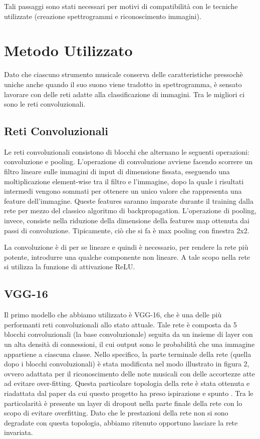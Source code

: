 \documentclass{article}
\begin{document}
Tali passaggi sono stati necessari per motivi di compatibilità con le tecniche utilizzate (creazione spettrogrammi e riconoscimento immagini).

\section{Metodo Utilizzato}
Dato che ciascuno strumento musicale conserva delle caratteristiche pressochè uniche anche quando il suo suono viene tradotto in spettrogramma,
è sensato lavorare con delle reti adatte alla classificazione di immagini. Tra le migliori ci sono le reti convoluzionali.

\subsection{Reti Convoluzionali}
Le reti convoluzionali consistono di blocchi che alternano le seguenti operazioni:
convoluzione e pooling. L'operazione di convoluzione avviene facendo scorrere un filtro lineare sulle immagini di input di dimensione fissata,
eseguendo una moltiplicazione element-wise tra il filtro e l'immagine, dopo la quale i risultati intermedi vengono sommati per ottenere un unico valore
che rappresenta una feature dell'immagine. Queste features saranno imparate durante il training dalla rete per mezzo del classico algoritmo di backpropagation.
L'operazione di pooling, invece, consiste nella riduzione della dimensione della features map ottenuta dai passi di convoluzione. 
Tipicamente, ciò che si fa è max pooling con finestra 2x2.  

La convoluzione è di per se lineare e quindi è necessario, per rendere la rete più potente, introdurre una qualche componente non lineare.
A tale scopo nella rete si utilizza la funzione di attivazione ReLU. 

\subsection{VGG-16}
Il primo modello che abbiamo utilizzato è VGG-16, che è una delle più performanti reti convoluzionali allo stato attuale.
Tale rete è composta da 5 blocchi convoluzionali (la base convoluzionale) seguita da un insieme di layer con un alta densità di connessioni,
il cui output sono le probabilità che una immagine appartiene a ciascuna classe.
Nello specifico, la parte terminale della rete (quella dopo i blocchi convoluzionali) è stata modificata nel modo illustrato in figura 2, 
ovvero adattata per il riconoscimento delle note musicali con delle accortezze atte ad evitare over-fitting. Questa particolare topologia della rete
è stata ottenuta e riadattata dal paper da cui questo progetto ha preso ispirazione e spunto \cite{paper}. Tra le particolarità
è presente un layer di dropout nella parte finale della rete con lo scopo di evitare overfitting. Dato che le prestazioni della rete non si sono degradate
con questa topologia, abbiamo ritenuto opportuno lasciare la rete invariata.
\end{document}
